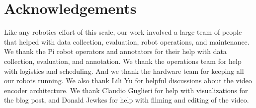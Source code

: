 \documentclass[conference]{IEEEtran}
\theoremstyle{plain}
\theoremstyle{definition}
\theoremstyle{remark}
\begin{document}
\section*{Acknowledgements}
Like any robotics effort of this scale, our work involved a large team of people that helped with data collection, evaluation, robot operations, and maintenance. We thank the Pi robot operators and annotators for their help with data collection, evaluation, and annotation. We thank the operations team for help with logistics and scheduling. And we thank the hardware team for keeping all our robots running. We also thank Lili Yu for helpful discussions about the video encoder architecture. We thank Claudio Guglieri for help with visualizations for the blog post, and Donald Jewkes for help with filming and editing of the video.






\end{document}
